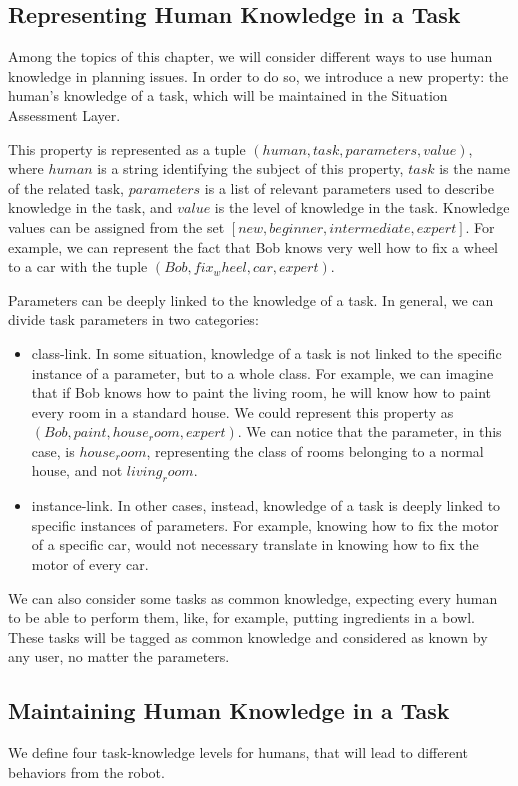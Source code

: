 \subsection{Representing Human Knowledge in a Task}
Among the topics of this chapter, we will consider different ways to use human knowledge in planning issues. In order to do so, we introduce a new property: the human's knowledge of a task, which will be maintained in the Situation Assessment Layer. 

This property is represented as a tuple $(human, task, parameters, value)$, where $human$ is a string identifying the subject of this property, $task$ is the name of the related task, $parameters$ is a list of relevant parameters used to describe knowledge in the task, and $value$ is the level of knowledge in the task. Knowledge values can be assigned from the set $[new, beginner, intermediate, expert]$.  For example, we can represent the fact that Bob knows very well how to fix a wheel to a car with the tuple $(Bob, fix_wheel, car, expert)$. 

Parameters can be deeply linked to the knowledge of a task. In general, we can divide task parameters in two categories:
\begin{itemize}
\item class-link. In some situation, knowledge of a task is not linked to the specific instance of a parameter, but to a whole class. For example, we can imagine that if Bob knows how to paint the living room, he will know how to paint every room in a standard house. We could represent this property as $(Bob, paint, house_room, expert)$. We can notice that the parameter, in this case, is $house_room$, representing the class of rooms belonging to a normal house, and not $living_room$.
\item instance-link. In other cases, instead, knowledge of a task is deeply linked to specific instances of parameters. For example, knowing how to fix the motor of a specific car, would not necessary translate in knowing how to fix the motor of every car.
\end{itemize}

We can also consider some tasks as common knowledge, expecting every human to be able to perform them, like, for example, putting ingredients in a bowl. These tasks will be tagged as common knowledge and considered as known by any user, no matter the parameters. 

\subsection{Maintaining Human Knowledge in a Task}
We define four task-knowledge levels for humans, that will lead to different behaviors from the robot.

